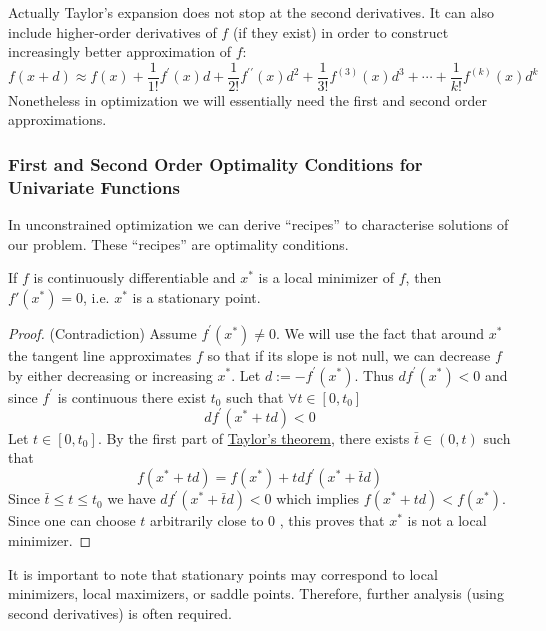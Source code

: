 \documentclass[9pt, headings=standardclasses, parskip=half]{scrartcl}
\renewcommand{\emph}[1]{\textcolor{mypurple}{#1}}
\begin{document}
Actually Taylor's expansion does not stop at the second derivatives. It can also include higher-order derivatives of $f$ (if they exist) in order to construct increasingly better approximation of $f$:
$$
f(x+d) \approx f(x)+\frac{1}{1!} f^{\prime}(x) d+\frac{1}{2!} f^{\prime \prime}(x) d^2+\frac{1}{3!} f^{(3)}(x) d^3+\cdots+\frac{1}{k!} f^{(k)}(x) d^k
$$
Nonetheless in optimization we will essentially need the first and second order approximations.

\subsubsection{First and Second Order Optimality Conditions for Univariate Functions}
In unconstrained optimization we can derive ``recipes'' to characterise solutions of our problem. These ``recipes'' are optimality conditions.

\begin{theorem}\label{thm:nec_first_order_optimality_univariate}
If \(f\) is continuously differentiable and \(x^*\) is a local minimizer of \(f\), then \(f'(x^*)=0\), i.e. \(x^*\) is a \emph{stationary point}.
\end{theorem}
\begin{proof}
(Contradiction)
Assume $f^{\prime}\left(x^*\right) \neq 0$. We will use the fact that around $x^*$ the tangent line approximates $f$ so that if its slope is not null, we can decrease $f$ by either decreasing or increasing $x^*$. Let $d:=-f^{\prime}\left(x^*\right)$. Thus $d f^{\prime}\left(x^*\right)<0$ and since $f^{\prime}$ is continuous there exist $t_0$ such that $\forall t \in\left[0, t_0\right]$
$$
d f^{\prime}\left(x^*+t d\right)<0
$$
Let $t \in\left[0, t_0\right]$. By the first part of  \hyperref[thm:univariate_taylor_expansion]{Taylor's theorem}, there exists $\bar{t} \in(0, t)$ such that
$$
f\left(x^*+t d\right)=f\left(x^*\right)+t d f^{\prime}\left(x^*+\bar{t} d\right)
$$
Since $\bar{t} \leq t \leq t_0$ we have $d f^{\prime}\left(x^*+\bar{t} d\right)<0$ which implies $f\left(x^*+t d\right)<f\left(x^*\right)$. Since one can choose $t$ arbitrarily close to 0 , this proves that $x^*$ is not a local minimizer.
\end{proof}


It is important to note that stationary points may correspond to local minimizers, local maximizers, or saddle points. Therefore, further analysis (using second derivatives) is often required.
\end{document}

